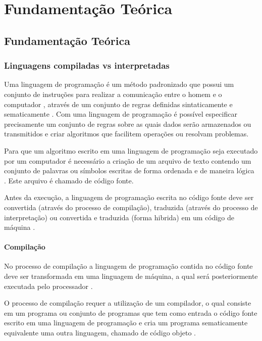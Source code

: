 \part{Fundamentação Teórica}

\chapter[Fundamentação Teórica]{Fundamentação Teórica}

\section{Linguagens compiladas vs interpretadas}

Uma linguagem de programação é um método padronizado que possui
 um conjunto de instruções para realizar a comunicação entre o homem
 e o computador \cite{ref1} , através de um conjunto de regras
 definidas sintaticamente e sematicamente \cite{ref2}.
 Com uma linguagem
 de programação é possível especificar precisamente um conjunto de regras
 sobre  as quais dados serão armazenados ou transmitidos e criar algoritmos
 que facilitem operações ou resolvam problemas.
    
Para que um algoritmo escrito em uma linguagem de programação seja executado 
por um computador é necessário a criação de um arquivo de texto contendo um 
conjunto de palavras ou símbolos escritas de forma ordenada  e de maneira 
lógica \cite{ref3}. Este arquivo é chamado de código fonte.
    
Antes da execução, a linguagem de programação escrita no código fonte deve
 ser convertida (através do processo de compilação), traduzida (através do 
processo de interpretação) ou convertida e traduzida (forma hibrida) em um 
código de máquina \cite{ref4}.

\subsection{Compilação}

No processo de compilação a linguagem de programação contida no código fonte
 deve ser transformada em uma linguagem de máquina, a qual será posteriormente
 executada pelo processador \cite{ref2}. 

O processo de compilação requer a utilização de um compilador, o qual consiste
 em um programa ou conjunto de programas  que tem como entrada o código fonte 
escrito em uma linguagem de programação e cria um programa sematicamente 
equivalente uma outra linguagem, chamado de código objeto \cite{ref4}.


